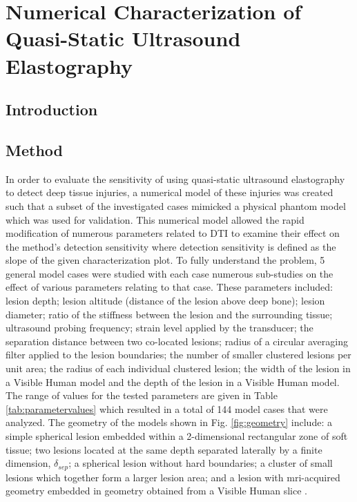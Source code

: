 \chapter{Numerical Characterization of Quasi-Static Ultrasound Elastography}
	\section{Introduction}
		\lipsum[1]
	\section{Method}
	\label{sec:method}
		In order to evaluate the sensitivity of using quasi-static ultrasound elastography to detect deep tissue injuries, a numerical model of these injuries was created such that a subset of the investigated cases mimicked a physical phantom model which was used for validation. This numerical model allowed the rapid modification of numerous parameters related to DTI to examine their effect on the method's detection sensitivity where detection sensitivity is defined as the slope of the given characterization plot. To fully understand the problem, 5 general model cases  were studied with each case  numerous sub-studies on the effect of various parameters relating to that case. These parameters included: lesion depth; lesion altitude (distance of the lesion above deep bone); lesion diameter; ratio of the stiffness between the lesion and the surrounding tissue; ultrasound probing frequency; strain level applied by the transducer; the separation distance between two co-located lesions; radius of a circular averaging filter applied to the lesion boundaries; the number of smaller clustered lesions per unit area; the radius of each individual clustered lesion; the width of the lesion in a Visible Human \cite{visiblehuman} model and the depth of the lesion in a Visible Human model. The range of values for the tested parameters are given in Table \ref{tab:parametervalues} which resulted in a total of 144 model cases that were analyzed. The geometry of the models shown in Fig. \ref{fig:geometry} include: a simple spherical lesion embedded within a 2-dimensional rectangular zone of soft tissue; two lesions located at the same depth separated laterally by a finite dimension, $\delta_{sep}$; a spherical lesion without hard boundaries; a cluster of small lesions which together form a larger lesion area; and a lesion with mri-acquired geometry \cite{solis13} embedded in geometry obtained from a Visible Human slice \cite{visiblehuman}.


